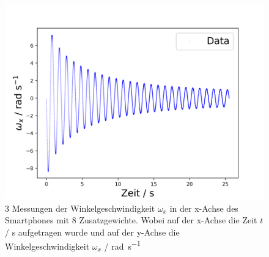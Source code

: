 \documentclass[11pt,ngerman]{scrartcl}
\begin{document}
\begin{figure}[H]
\begin{minipage}[htbp]{\linewidth}
\begin{minipage}[htbp]{.32\linewidth}
            \includegraphics[width=\linewidth]{pics/omega/fit_of_t_wx_mess_nr_9.png}
        \end{minipage}
        \caption[Schwingungsmessungen mit 8 Zusatzgewichte]{3 Messungen der Winkelgeschwindigkeit $\omega_{x}$ in der x-Achse des Smartphones mit 8 Zusatzgewichte.
        Wobei auf der x-Achse die Zeit $t$ / \si{\second} aufgetragen wurde und auf der y-Achse die Winkelgeschwindigkeit $\omega_x$ / \si{\radian\per\second} }
        \label{fig:mit8}
    \end{minipage}
 \end{figure}
\end{document}
